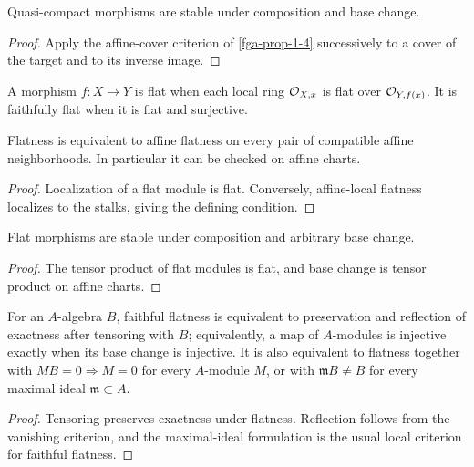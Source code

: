\begin{proposition}\label{fga-prop-1-6}
Quasi-compact morphisms are stable under composition and base change.
\end{proposition}
\begin{proof}
Apply the affine-cover criterion of \cref{fga-prop-1-4} successively to a
cover of the target and to its inverse image.
\end{proof}

\begin{definition}\label{fga-def-1-7}\uses{}
A morphism $f:X\to Y$ is flat when each local ring $\mathcal O_{X,x}$ is flat over
$\mathcal O_{Y,f(x)}$.  It is faithfully flat when it is flat and surjective.
\end{definition}\begin{proposition}\label{fga-prop-1-8}
Flatness is equivalent to affine flatness on every pair of compatible affine
neighborhoods.  In particular it can be checked on affine charts.
\end{proposition}
\begin{proof}
Localization of a flat module is flat.  Conversely, affine-local flatness
localizes to the stalks, giving the defining condition.
\end{proof}

\begin{proposition}\label{fga-prop-1-9}
Flat morphisms are stable under composition and arbitrary base change.
\end{proposition}
\begin{proof}
The tensor product of flat modules is flat, and base change is tensor product
on affine charts.
\end{proof}

\begin{proposition}\label{fga-prop-1-11}
For an $A$-algebra $B$, faithful flatness is equivalent to preservation and
reflection of exactness after tensoring with $B$; equivalently, a map of
$A$-modules is injective exactly when its base change is injective.  It is also
equivalent to flatness together with $MB=0\Rightarrow M=0$ for every
$A$-module $M$, or with $\mathfrak mB\ne B$ for every maximal ideal
$\mathfrak m\subset A$.
\end{proposition}
\begin{proof}
Tensoring preserves exactness under flatness.  Reflection follows from the
vanishing criterion, and the maximal-ideal formulation is the usual local
criterion for faithful flatness.
\end{proof}

